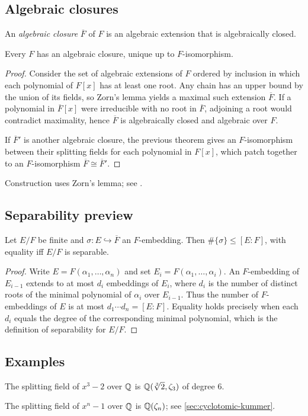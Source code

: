 \subsection{Algebraic closures}
\begin{definition}
An \emph{algebraic closure} $\overline{F}$ of $F$ is an algebraic extension that is algebraically closed.
\end{definition}
\begin{theorem}
Every $F$ has an algebraic closure, unique up to $F$-isomorphism.
\end{theorem}
\begin{proof}
Consider the set of algebraic extensions of $F$ ordered by inclusion in which
each polynomial of $F[x]$ has at least one root. Any chain has an upper bound by
the union of its fields, so Zorn's lemma yields a maximal such extension
$\overline{F}$. If a polynomial in $\overline{F}[x]$ were irreducible with no
root in $\overline{F}$, adjoining a root would contradict maximality, hence
$\overline{F}$ is algebraically closed and algebraic over $F$.

If $\overline{F}'$ is another algebraic closure, the previous theorem gives an
$F$-isomorphism between their splitting fields for each polynomial in $F[x]$,
which patch together to an $F$-isomorphism $\overline{F}\cong\overline{F}'$.
\end{proof}
\begin{remark}
Construction uses Zorn's lemma; see \cite[Ch.~VIII]{Lang}.
\end{remark}

\subsection{Separability preview}
\begin{proposition}
Let $E/F$ be finite and $\sigma:E\hookrightarrow \overline{F}$ an $F$-embedding. Then $\#\{\sigma\}\le [E\!:\!F]$, with equality iff $E/F$ is separable.
\end{proposition}
\begin{proof}
Write $E=F(\alpha_1,\ldots,\alpha_n)$ and set $E_i=F(\alpha_1,\ldots,\alpha_i)$.
An $F$-embedding of $E_{i-1}$ extends to at most $d_i$ embeddings of $E_i$,
where $d_i$ is the number of distinct roots of the minimal polynomial of
$\alpha_i$ over $E_{i-1}$. Thus the number of $F$-embeddings of $E$ is at most
$d_1\cdots d_n=[E\!:\!F]$. Equality holds precisely when each $d_i$ equals the
degree of the corresponding minimal polynomial, which is the definition of
separability for $E/F$.
\end{proof}

\subsection{Examples}
\begin{example}
The splitting field of $x^3-2$ over $\mathbb{Q}$ is $\Q(\root3\of2,\zeta_3)$ of degree $6$.
\end{example}
\begin{example}
The splitting field of $x^n-1$ over $\mathbb{Q}$ is $\mathbb{Q}(\zeta_n)$; see \cref{sec:cyclotomic-kummer}.
\end{example}
